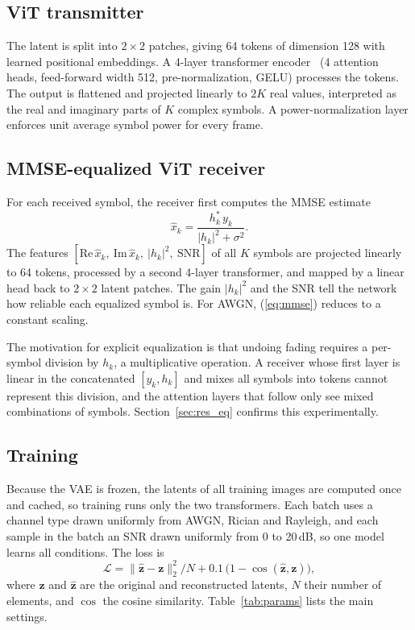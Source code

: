 \documentclass[conference]{IEEEtran}
\begin{document}
\subsection{ViT transmitter}
The latent is split into $2\times2$ patches, giving 64 tokens of dimension 128 with learned positional embeddings. A 4-layer transformer encoder~\cite{vaswani2017attention} (4 attention heads, feed-forward width 512, pre-normalization, GELU) processes the tokens. The output is flattened and projected linearly to $2K$ real values, interpreted as the real and imaginary parts of $K$ complex symbols. A power-normalization layer enforces unit average symbol power for every frame.

\subsection{MMSE-equalized ViT receiver}
For each received symbol, the receiver first computes the MMSE estimate
\begin{equation}
\hat{x}_k = \frac{h_k^*\,y_k}{|h_k|^2+\sigma^2}.
\label{eq:mmse}
\end{equation}
The features $[\mathrm{Re}\,\hat{x}_k,\ \mathrm{Im}\,\hat{x}_k,\ |h_k|^2,\ \mathrm{SNR}]$ of all $K$ symbols are projected linearly to 64 tokens, processed by a second 4-layer transformer, and mapped by a linear head back to $2\times2$ latent patches. The gain $|h_k|^2$ and the SNR tell the network how reliable each equalized symbol is. For AWGN, (\ref{eq:mmse}) reduces to a constant scaling.

The motivation for explicit equalization is that undoing fading requires a per-symbol division by $h_k$, a multiplicative operation. A receiver whose first layer is linear in the concatenated $[y_k, h_k]$ and mixes all symbols into tokens cannot represent this division, and the attention layers that follow only see mixed combinations of symbols. Section~\ref{sec:res_eq} confirms this experimentally.

\subsection{Training}
Because the VAE is frozen, the latents of all training images are computed once and cached, so training runs only the two transformers. Each batch uses a channel type drawn uniformly from AWGN, Rician and Rayleigh, and each sample in the batch an SNR drawn uniformly from 0 to 20\,dB, so one model learns all conditions. The loss is
\begin{equation}
\mathcal{L} = \|\hat{\mathbf{z}}-\mathbf{z}\|_2^2/N + 0.1\,\bigl(1-\cos(\hat{\mathbf{z}},\mathbf{z})\bigr),
\end{equation}
where $\mathbf{z}$ and $\hat{\mathbf{z}}$ are the original and reconstructed latents, $N$ their number of elements, and $\cos$ the cosine similarity. Table~\ref{tab:params} lists the main settings.
\end{document}
